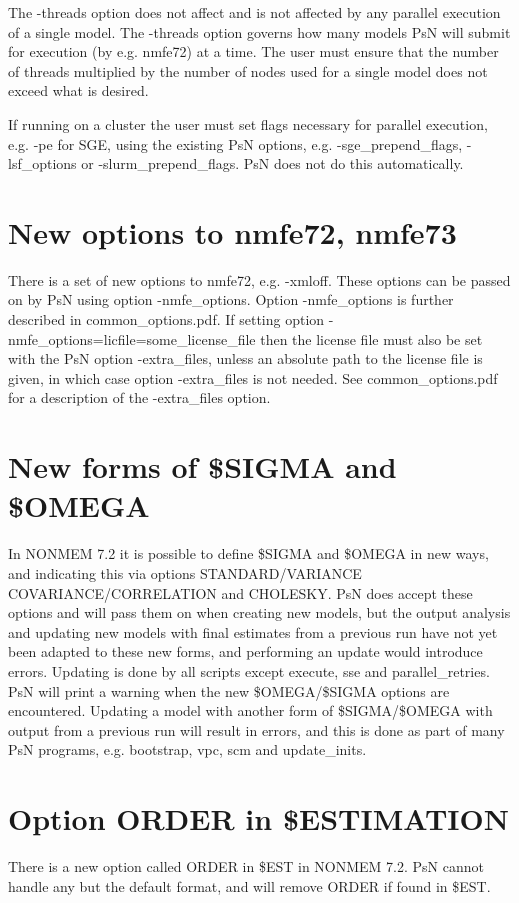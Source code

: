 The -threads option does not affect and is not affected by any parallel execution of a single model. The -threads option governs how many models PsN will submit for execution (by e.g. nmfe72) at a time. The user must ensure that the number of threads multiplied by the number of nodes used for a single model does not exceed what is desired. 

If running on a cluster the user must set flags necessary for parallel execution, e.g. -pe for SGE, using the existing PsN options, e.g. -sge\_prepend\_flags, -lsf\_options or -slurm\_prepend\_flags. PsN does not do this automatically. 
\section{New options to nmfe72, nmfe73}
There is a set of new options to nmfe72, e.g. -xmloff. These options can be passed on by PsN using option -nmfe\_options. Option -nmfe\_options is further described in common\_options.pdf. If setting option -nmfe\_options=licfile=some\_license\_file then the license file must also be set with the PsN option -extra\_files, unless an absolute path to the license file is given, in which case option -extra\_files is not needed. See common\_options.pdf 
for a description of the -extra\_files option.

\section{New forms of \$SIGMA and \$OMEGA}
In NONMEM 7.2 it is possible to define \$SIGMA and \$OMEGA in new ways, and indicating this via options STANDARD/VARIANCE COVARIANCE/CORRELATION and CHOLESKY. PsN does accept these options and will pass them on when creating new models, but the output analysis and updating new models with final estimates from a previous run have not yet been adapted to these new forms, and performing an update would introduce errors. Updating is done by all scripts except execute, sse and parallel\_retries. PsN will print a warning when the new \$OMEGA/\$SIGMA options are encountered. Updating a model with another form of \$SIGMA/\$OMEGA with output from a previous run will result in errors, and this is done as part of many PsN programs, e.g. bootstrap, vpc, scm and update\_inits. 

\section{Option ORDER in \$ESTIMATION}
There is a new option called ORDER in \$EST in NONMEM 7.2. PsN cannot handle any but the default format, and will remove ORDER if found in \$EST.

